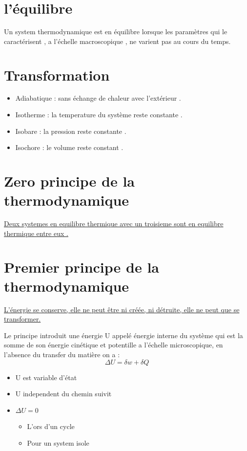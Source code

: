 \documentclass[12pt,oneside]{book}
\begin{document}
\section{l’équilibre }
Un system thermodynamique est en équilibre lorsque les paramètres qui le caractérisent , a l’échelle macroscopique , ne varient pas au cours du temps.
\section{Transformation}
\begin{itemize}
    \item Adiabatique : sans échange de chaleur avec l’extérieur .
    \item Isotherme : la temperature du système reste constante .
    \item Isobare : la pression reste constante .
    \item Isochore : le volume reste constant .
\end{itemize}
\section{Zero principe de la thermodynamique }
\begin{center}
    \underline{Deux systemes en equilibre thermique avec un troisieme sont en equilibre thermique entre eux .}
\end{center}
\section{Premier principe de la thermodynamique}
\begin{center}
    \underline{L'énergie se conserve, elle ne peut être ni créée, ni détruite, elle ne peut que se transformer.}
\end{center}
Le principe introduit une énergie U appelé énergie interne du système qui est la somme de son énergie cinétique et potentille a l’échelle microscopique, en l’absence du transfer du matière on a :
\[\boxed{\Delta U = \delta w + \delta Q}\]
\begin{itemize}
    \item U est variable d’état
    \item U independent du chemin suivit
    \item $\Delta U = 0$
          \begin{itemize}
              \item L'ors d'un cycle
              \item Pour un system isole
          \end{itemize}
\end{itemize}
\end{document}
